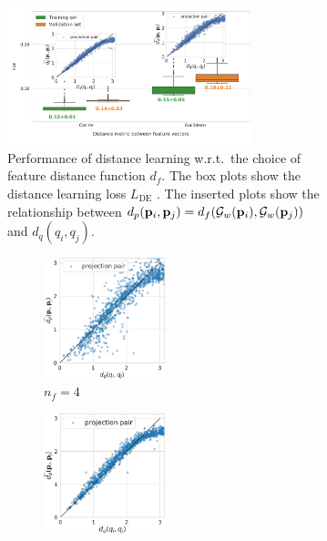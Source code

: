 \begin{figure}[ht]
    \centering
    \begin{subfigure}[b]{0.49\linewidth}
        \centering
        \includegraphics[height=4cm]{figures/dPdQ_feat_distances.pdf}
        \caption{%
            Performance of distance learning w.r.t.\ the choice of feature distance function $d_f$.
            The box plots show the distance learning loss $L_\text{DE}$ .
            The inserted plots show the relationship between $d_p(\mathbf{p}_i, \mathbf{p}_j) = d_f(\mathcal{G}_w(\mathbf{p}_i), \mathcal{G}_w(\mathbf{p}_j))$ and $d_q(q_i, q_j)$.
        }\label{fig:geo-eucl-mlp}
    \end{subfigure}
    \hfill
    \begin{subfigure}[b]{0.48\linewidth}
        \begin{subfigure}[t]{0.48\linewidth}
            \centering
            \includegraphics[height=3.5cm]{figures/dPdQ_5j0n_4d.pdf}
            \caption*{$n_f=4$} %
        \end{subfigure}
        \hfill
        \begin{subfigure}[t]{0.48\linewidth}
            \centering
            \includegraphics[height=3.5cm]{figures/dPdQ_5j0n_256.pdf}

\end{subfigure}
\end{subfigure}
\end{figure}
